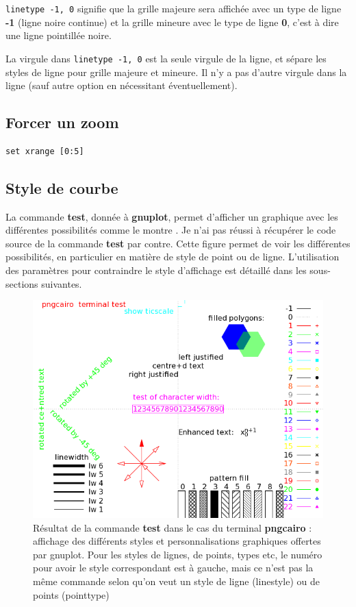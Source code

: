 \documentclass[a4paper,twoside]{article}
\begin{document}
\texttt{linetype -1, 0} signifie que la grille majeure sera affichée avec un type de ligne \textbf{-1} (ligne noire continue) et la grille mineure avec le type de ligne \textbf{0}, c'est à dire une ligne pointillée noire.

\begin{attention}
La virgule dans \texttt{linetype -1, 0} est la seule virgule de la ligne, et sépare les styles de ligne pour grille majeure et mineure. Il n'y a pas d'autre virgule dans la ligne (sauf autre option en nécessitant éventuellement).
\end{attention}




\subsection{Forcer un zoom}
\begin{verbatim}
set xrange [0:5]
\end{verbatim}

\subsection{Style de courbe}
La commande \textbf{test}, donnée à \textbf{gnuplot}, permet d'afficher un graphique avec les différentes possibilités comme le montre . Je n'ai pas réussi à récupérer le code source de la commande \textbf{test} par contre. Cette figure permet de voir les différentes possibilités, en particulier en matière de style de point ou de ligne. L'utilisation des paramètres pour contraindre le style d'affichage est détaillé dans les sous-sections suivantes.

\begin{figure}[htb]
\centering
\includegraphics[width=0.65\linewidth]{figures/test_styles.png}
\caption{Résultat de la commande \textbf{test} dans le cas du terminal \textbf{pngcairo} : affichage des différents styles et personnalisations graphiques offertes par gnuplot. Pour les styles de lignes, de points, types etc, le numéro pour avoir le style correspondant est à gauche, mais ce n'est pas la même commande selon qu'on veut un style de ligne (linestyle) ou de points (pointtype)}\label{fig:styles}
\end{figure}
\end{document}
